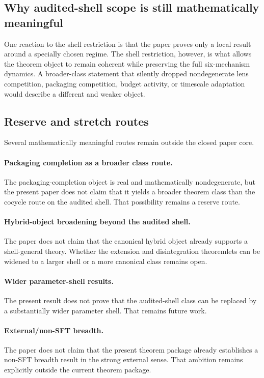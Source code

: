 \subsection{Why audited-shell scope is still mathematically meaningful}

One reaction to the shell restriction is that the paper proves only a local result around a specially chosen regime. The shell restriction, however, is what allows the theorem object to remain coherent while preserving the full six-mechanism dynamics. A broader-class statement that silently dropped nondegenerate lens competition, packaging competition, budget activity, or timescale adaptation would describe a different and weaker object.

\subsection{Reserve and stretch routes}

Several mathematically meaningful routes remain outside the closed paper core.

\paragraph{Packaging completion as a broader class route.}
The packaging-completion object is real and mathematically nondegenerate, but the present paper does not claim that it yields a broader theorem class than the cocycle route on the audited shell. That possibility remains a reserve route.

\paragraph{Hybrid-object broadening beyond the audited shell.}
The paper does not claim that the canonical hybrid object already supports a shell-general theory. Whether the extension and disintegration theoremlets can be widened to a larger shell or a more canonical class remains open.

\paragraph{Wider parameter-shell results.}
The present result does not prove that the audited-shell class can be replaced by a substantially wider parameter shell. That remains future work.

\paragraph{External/non-SFT breadth.}
The paper does not claim that the present theorem package already establishes a non-SFT breadth result in the strong external sense. That ambition remains explicitly outside the current theorem package.

